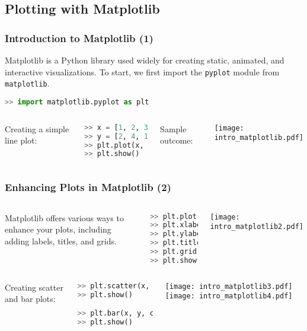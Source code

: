 \subsection*{Plotting with Matplotlib}
\begin{frame}[fragile]
  \frametitle{Introduction to Matplotlib (1)}
  Matplotlib is a Python library used widely for creating static, animated, and interactive visualizations. To start, we first import the \lstinline{pyplot} module from \lstinline{matplotlib}.\pause
  
  \begin{lstlisting}[language=Python, numbers=none]
>> import matplotlib.pyplot as plt
  \end{lstlisting}\pause
  
  \begin{columns}[T]
    Creating a simple line plot:

    \begin{lstlisting}[language=Python, numbers=none]
>> x = [1, 2, 3, 4, 5]
>> y = [2, 4, 1, 3, 7]
>> plt.plot(x, y)
>> plt.show()
  \end{lstlisting}
  Sample outcome:
  
  \texttt{[image: intro\_matplotlib.pdf]}
\end{columns}
\end{frame}

\begin{frame}[fragile]
  \frametitle{Enhancing Plots in Matplotlib (2)}

  \begin{columns}
  Matplotlib offers various ways to enhance your plots, including adding labels, titles, and grids.\pause
  \begin{lstlisting}[language=Python, numbers=none, basicstyle=\scriptsize]
>> plt.plot(x, y)
>> plt.xlabel('X-axis label')
>> plt.ylabel('Y-axis label')
>> plt.title('Plot Title')
>> plt.grid(True)
>> plt.show()
  \end{lstlisting}\pause
   \texttt{[image: intro\_matplotlib2.pdf]}
  \end{columns}

  \begin{columns}
  Creating scatter and bar plots:
  \begin{lstlisting}[language=Python, numbers=none, basicstyle=\scriptsize]
>> plt.scatter(x, y, color='red')
>> plt.show()

>> plt.bar(x, y, color='green')
>> plt.show()
  \end{lstlisting}
  \texttt{[image: intro\_matplotlib3.pdf]}
  \texttt{[image: intro\_matplotlib4.pdf]}
  \end{columns}
\end{frame}

